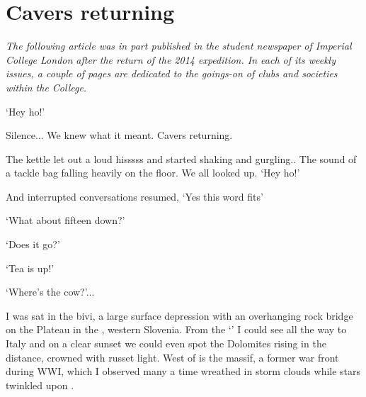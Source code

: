 \section{Cavers returning}


\textit{The following article was in part published in the student newspaper of Imperial College London  after the return of the 2014 expedition. In each of its weekly issues, a couple of pages are dedicated to the goings-on of clubs and societies within the College.}

\mydelimiter

`Hey ho!' 

Silence...  We knew what it meant. Cavers returning. 

The kettle let out a loud hisssss and started shaking and gurgling.. The sound of a tackle bag falling heavily on the floor. 
We all looked up. `Hey ho!'

And interrupted conversations resumed, `Yes this word fits'

`What about fifteen down?'

`Does it go?'

`Tea is up!'

`Where's the cow?'...

I was sat in the bivi, a large surface depression with an overhanging rock bridge on the  Plateau in the , western Slovenia. From the `' I could see all the way to Italy and on a clear sunset we could even spot the Dolomites rising in the distance, crowned with russet light. West of  is the  massif, a former war front during WWI, which I observed many a time wreathed in storm clouds while stars twinkled upon .



